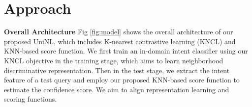 \documentclass[11pt]{article}
\begin{document}
\section{Approach}
\label{method}

\textbf{Overall Architecture} Fig \ref{fig:model} shows the overall architecture of our proposed UniNL, which includes K-nearest contrastive learning (KNCL) and KNN-based score function. We first train an in-domain intent classifier using our KNCL objective in the training stage, which aims to learn neighborhood discriminative representation. Then in the test stage, we extract the intent feature of a test query and employ our proposed KNN-based score function to estimate the confidence score. We aim to align representation learning and scoring functions. 

\begin{table}[t]
\centering
{}
\end{table}
\end{document}
